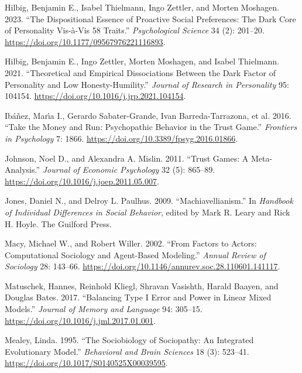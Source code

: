 \documentclass[
]{article}
\newlength{\cslhangindent}
\newenvironment{CSLReferences}[2] %
 {\begin{list}{}{%
  \setlength{\itemindent}{0pt}
  \setlength{\leftmargin}{0pt}
  \setlength{\parsep}{0pt}
  \ifodd #1
   \setlength{\leftmargin}{\cslhangindent}
   \setlength{\itemindent}{-1\cslhangindent}
  \fi
  \setlength{\itemsep}{#2\baselineskip}}}
 {\end{list}}
\begin{document}
\begin{CSLReferences}{1}{1}
Hilbig, Benjamin E., Isabel Thielmann, Ingo Zettler, and Morten Moshagen. 2023. {``The Dispositional Essence of Proactive Social Preferences: The Dark Core of Personality Vis-{à}-Vis 58 Traits.''} \emph{Psychological Science} 34 (2): 201--20. \url{https://doi.org/10.1177/09567976221116893}.

Hilbig, Benjamin E., Ingo Zettler, Morten Moshagen, and Isabel Thielmann. 2021. {``Theoretical and Empirical Dissociations Between the Dark Factor of Personality and Low Honesty-Humility.''} \emph{Journal of Research in Personality} 95: 104154. \url{https://doi.org/10.1016/j.jrp.2021.104154}.

Ibáñez, Marı́a I., Gerardo Sabater-Grande, Ivan Barreda-Tarrazona, et al. 2016. {``Take the Money and Run: {Psychopathic} Behavior in the Trust Game.''} \emph{Frontiers in Psychology} 7: 1866. \url{https://doi.org/10.3389/fpsyg.2016.01866}.

Johnson, Noel D., and Alexandra A. Mislin. 2011. {``Trust Games: A Meta-Analysis.''} \emph{Journal of Economic Psychology} 32 (5): 865--89. \url{https://doi.org/10.1016/j.joep.2011.05.007}.

Jones, Daniel N., and Delroy L. Paulhus. 2009. {``{Machiavellianism}.''} In \emph{Handbook of Individual Differences in Social Behavior}, edited by Mark R. Leary and Rick H. Hoyle. The Guilford Press.

Macy, Michael W., and Robert Willer. 2002. {``From Factors to Actors: Computational Sociology and Agent-Based Modeling.''} \emph{Annual Review of Sociology} 28: 143--66. \url{https://doi.org/10.1146/annurev.soc.28.110601.141117}.

Matuschek, Hannes, Reinhold Kliegl, Shravan Vasishth, Harald Baayen, and Douglas Bates. 2017. {``Balancing {Type I} Error and Power in Linear Mixed Models.''} \emph{Journal of Memory and Language} 94: 305--15. \url{https://doi.org/10.1016/j.jml.2017.01.001}.

Mealey, Linda. 1995. {``The Sociobiology of Sociopathy: {An} Integrated Evolutionary Model.''} \emph{Behavioral and Brain Sciences} 18 (3): 523--41. \url{https://doi.org/10.1017/S0140525X00039595}.


\end{CSLReferences}
\end{document}
